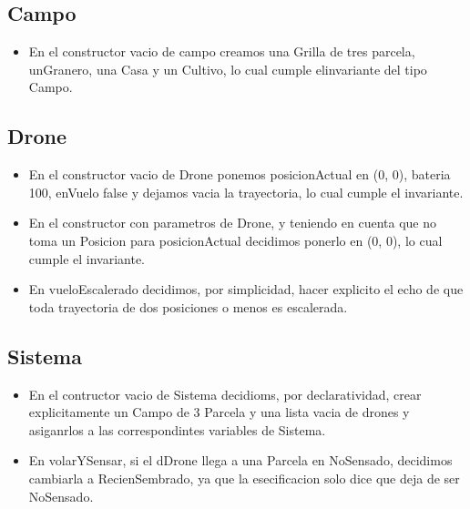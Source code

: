 \subsection{Campo}

\begin{itemize}
\item{En el constructor vacio de campo creamos una Grilla de tres parcela,
unGranero,
una Casa y un Cultivo, lo cual cumple elinvariante del tipo Campo.}
	
	
\end{itemize}
 
\subsection{Drone}
 
\begin{itemize}
 
\item{En el constructor vacio de Drone ponemos posicionActual en (0, 0),
 bateria 100, enVuelo false y dejamos vacia la trayectoria,
  lo cual cumple el invariante.} 

\item{En el constructor con parametros de Drone, y teniendo en cuenta que no toma un Posicion para posicionActual decidimos ponerlo en (0, 0),
  lo cual cumple el invariante.} 
  
\item{En vueloEscalerado decidimos, por simplicidad, hacer explicito el echo de que toda trayectoria de dos posiciones o menos es escalerada.}
 
\end{itemize}


\subsection{Sistema}

\begin{itemize}

\item{En el contructor vacio de Sistema decidioms, por declaratividad, crear explicitamente un Campo de 3 Parcela y una lista vacia de drones y asiganrlos a las correspondintes variables de Sistema.}

\item{En volarYSensar, si el dDrone llega a una Parcela en NoSensado, decidimos cambiarla a RecienSembrado, ya que la esecificacion solo dice que deja de ser NoSensado. }

\end{itemize}
